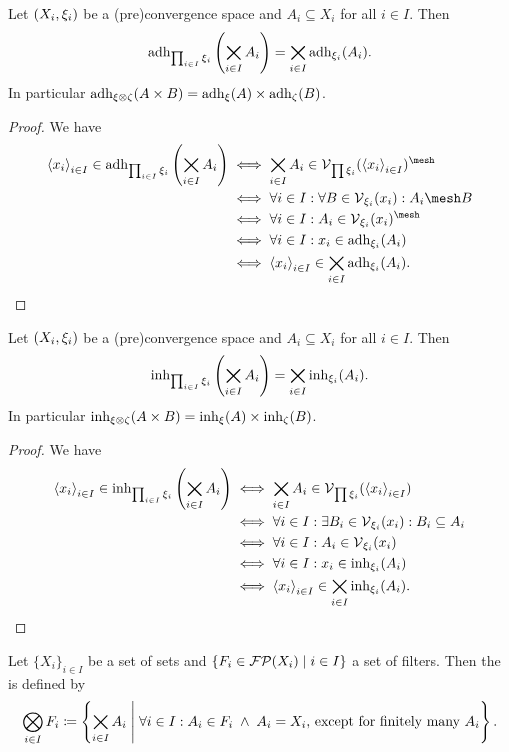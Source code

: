 \begin{corollary} \label{productAdherence}
Let $\left( X_i, \xi_i \right)$ be a (pre)convergence space and $A_i\subseteq X_i$ for all $i\in I$. Then
\[ \operatorname{adh}_{\prod_{i\in I}\xi_i}\left(\bigtimes_{i\in I}A_i\right) = \bigtimes_{i\in I}\operatorname{adh}_{\xi_i}(A_i). \]
In particular $\operatorname{adh}_{\xi\otimes \zeta}(A\times B) = \operatorname{adh}_\xi(A) \times \operatorname{adh}_\zeta(B)$.
\end{corollary}
\begin{proof}
We have
\begin{align*}
\seq{x_i}_{i\in I} \in \adh_{\prod_{i\in I}\xi_i}\left(\bigtimes_{i\in I}A_i\right) &\iff \bigtimes_{i\in I}A_i \in \vicinity_{\prod \xi_i}(\seq{x_i}_{i\in I})^{\mesh} \\
&\iff \forall i\in I: \forall B \in \vicinity_{\xi_i}(x_i): A_i\mesh B \\
&\iff \forall i\in I: A_i \in \vicinity_{\xi_i}(x_i)^{\mesh} \\
&\iff \forall i\in I: x_i \in \adh_{\xi_i}(A_i) \\
&\iff \seq{x_i}_{i\in I} \in \bigtimes_{i\in I}\adh_{\xi_i}(A_i).
\end{align*}
\end{proof}
\begin{corollary} \label{productInherence}
Let $\left( X_i, \xi_i \right)$ be a (pre)convergence space and $A_i\subseteq X_i$ for all $i\in I$. Then
\[ \operatorname{inh}_{\prod_{i\in I}\xi_i}\left(\bigtimes_{i\in I}A_i\right) = \bigtimes_{i\in I}\operatorname{inh}_{\xi_i}(A_i). \]
In particular $\operatorname{inh}_{\xi\otimes \zeta}(A\times B) = \operatorname{inh}_\xi(A) \times \operatorname{inh}_\zeta(B)$.
\end{corollary}
\begin{proof}
We have
\begin{align*}
\left\langle x_i \right\rangle_{i\in I} \in \operatorname{inh}_{\prod_{i\in I}\xi_i}\left(\bigtimes_{i\in I}A_i\right) &\iff \bigtimes_{i\in I}A_i \in \operatorname{\mathcal{V}}_{\prod \xi_i}(\left\langle x_i \right\rangle_{i\in I}) \\
&\iff \forall i\in I: \exists B_i \in \operatorname{\mathcal{V}}_{\xi_i}(x_i): B_i\subseteq A_i \\
&\iff \forall i\in I: A_i \in \operatorname{\mathcal{V}}_{\xi_i}(x_i) \\
&\iff \forall i\in I: x_i \in \operatorname{inh}_{\xi_i}(A_i) \\
&\iff \left\langle x_i \right\rangle_{i\in I} \in \bigtimes_{i\in I}\operatorname{inh}_{\xi_i}(A_i).
\end{align*}
\end{proof}

\begin{definition}
Let $\{X_i\}_{i\in I}$ be a set of sets and $\left\{ F_i \in \operatorname{\mathcal{FP}}(X_i) \;\middle|\; i\in I \right\}$ a set of filters. Then the  is defined by
\[ \bigotimes_{i\in I}F_i \coloneqq \left\{ \bigtimes_{i\in I}A_i \;\middle|\; \forall i\in I: A_i \in F_i \;\land\; A_i = X_i, \,\text{except for finitely many $A_i$} \right\}.  \]
\end{definition}

